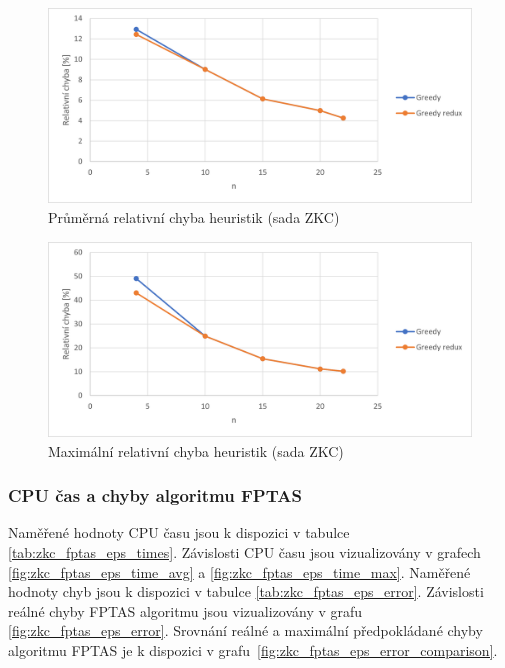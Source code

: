 \documentclass[12pt]{article}
\begin{document}
\begin{figure}[ht]\centering
    \includegraphics[width=1\textwidth, keepaspectratio]{graphs/ZKC/heuristics/zkc_greedy_avg.png}
    \caption{Průměrná relativní chyba heuristik (sada ZKC)}
    \label{fig:zkc_greedy_avg}
\end{figure}

\begin{figure}[ht]\centering
    \includegraphics[width=1\textwidth, keepaspectratio]{graphs/ZKC/heuristics/zkc_greedy_max.png}
    \caption{Maximální relativní chyba heuristik (sada ZKC)}
    \label{fig:zkc_greedy_max}
\end{figure}

\subsubsection{CPU čas a chyby algoritmu FPTAS}

Naměřené hodnoty CPU času jsou k dispozici v tabulce \ref{tab:zkc_fptas_eps_times}. Závislosti CPU času jsou vizualizovány v grafech \ref{fig:zkc_fptas_eps_time_avg} a \ref{fig:zkc_fptas_eps_time_max}.
Naměřené hodnoty chyb jsou k dispozici v tabulce \ref{tab:zkc_fptas_eps_error}. Závislosti reálné chyby FPTAS algoritmu jsou vizualizovány v grafu \ref{fig:zkc_fptas_eps_error}. Srovnání reálné a maximální předpokládané chyby algoritmu FPTAS je k dispozici v grafu~\ref{fig:zkc_fptas_eps_error_comparison}.
\end{document}
